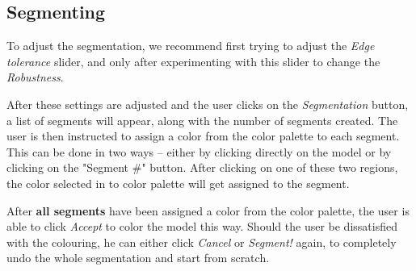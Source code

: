 \subsection{Segmenting}

To adjust the segmentation, we recommend first trying to adjust the \textit{Edge tolerance} slider, and only after experimenting with this slider to change the \textit{Robustness}.

After these settings are adjusted and the user clicks on the \textit{Segmentation} button, a list of segments will appear, along with the number of segments created. The user is then instructed to assign a color from the color palette to each segment. This can be done in two ways -- either by clicking directly on the model or by clicking on the "Segment \#" button. After clicking on one of these two regions, the color selected in to color palette will get assigned to the segment.

After \textbf{all segments} have been assigned a color from the color palette, the user is able to click \textit{Accept} to color the model this way. Should the user be dissatisfied with the colouring, he can either click \textit{Cancel} or \textit{Segment!} again, to completely undo the whole segmentation and start from scratch.
